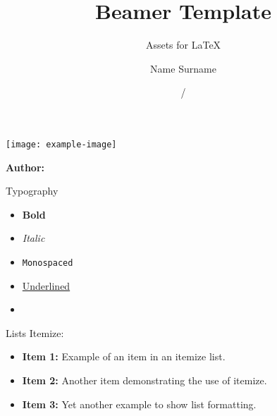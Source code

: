 \documentclass[12pt]{beamer}
\title[Insitute]{Beamer Template}
\subtitle{Assets for \LaTeX}
\author[Name Surname]{Name Surname}
\institute[]{Insitute}
\date{\currentyear/\nextyear} %
\begin{document}
\begin{frame}{}
	\vspace{\fill}

	\texttt{[image: example-image]}

	\vspace{\fill}

	\Large
	\color{main}
	\inserttitle

	\medskip

	\large
	\color{black}
	\insertsubtitle

	\vspace{\fill}

	\footnotesize
	\insertinstitute

	\vspace{\fill}

	\textbf{Author:} \insertauthor

	\medskip

	\insertdate

	\vspace{\fill}
\end{frame}

\begin{frame}[allowframebreaks]{Typography}
	\begin{itemize}
		\item \textbf{Bold}
		\item \textit{Italic}
		\item \texttt{Monospaced}
		\item \underline{Underlined}
		\item \href{https://example.com/}{\underline{\color{main}{Link}}}
	\end{itemize}
\end{frame}

\begin{frame}[allowframebreaks]{Lists}
	Itemize:

	\begin{itemize}
		\item \textbf{Item 1:} Example of an item in an itemize list.
		\item \textbf{Item 2:} Another item demonstrating the use of itemize.
		\item \textbf{Item 3:} Yet another example to show list formatting.
	\end{itemize}
\end{frame}
\end{document}

